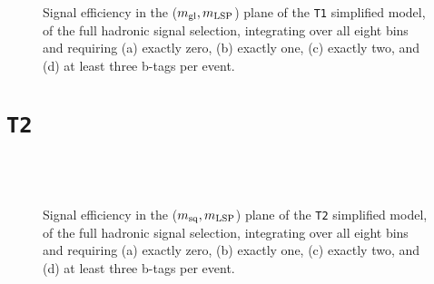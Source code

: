 \begin{figure}[h!]
  \begin{center}
     \\
     \\
    \caption{\label{fig:sig-eff-t1}Signal efficiency in the ($m_{\rm
        gl},m_{\rm LSP}$) plane of the \texttt{T1} simplified model,
      of the full hadronic signal selection, integrating over all
      eight \HT bins and requiring (a) exactly zero, (b) exactly
      one, (c) exactly two, and (d) at least three b-tags per event.}
  \end{center}
\end{figure}

\newpage
\section{\texttt{T2}\label{app:sig-eff-t2}}

\begin{figure}[h!]
  \begin{center}
     \\
     \\
    \caption{\label{fig:sig-eff-t2}Signal efficiency in the ($m_{\rm
        sq},m_{\rm LSP}$) plane of the \texttt{T2} simplified model,
      of the full hadronic signal selection, integrating over all
      eight \HT bins and requiring (a) exactly zero, (b) exactly
      one, (c) exactly two, and (d) at least three b-tags per event.}
  \end{center}
\end{figure}

